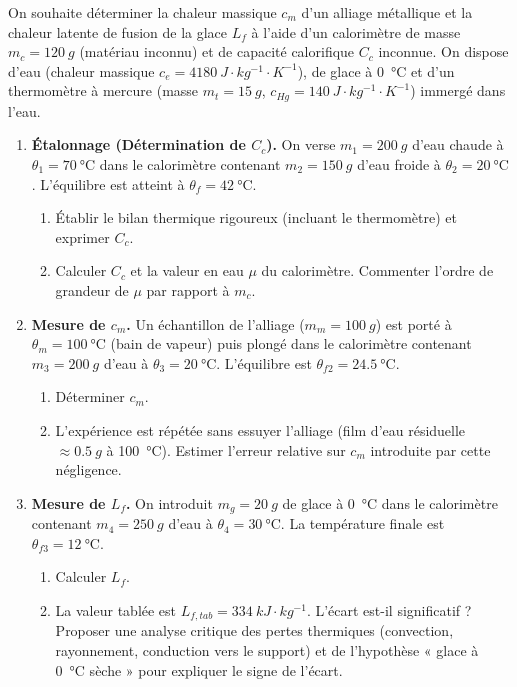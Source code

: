 \documentclass[11pt]{article}
\begin{document}
\begin{exercice}
On souhaite déterminer la chaleur massique $c_m$ d'un alliage métallique et la chaleur latente de fusion de la glace $L_f$ à l'aide d'un calorimètre de masse $m_c = \SI{120}{g}$ (matériau inconnu) et de capacité calorifique $C_c$ inconnue. On dispose d'eau (chaleur massique $c_e = \SI{4180}{J\cdot kg^{-1}\cdot K^{-1}}$), de glace à \SI{0}{\celsius} et d'un thermomètre à mercure (masse $m_t = \SI{15}{g}$, $c_{Hg} = \SI{140}{J\cdot kg^{-1}\cdot K^{-1}}$) immergé dans l'eau.

\begin{enumerate}
    \item \textbf{Étalonnage (Détermination de $C_c$).} On verse $m_1 = \SI{200}{g}$ d'eau chaude à $\theta_1 = \SI{70}{\celsius}$ dans le calorimètre contenant $m_2 = \SI{150}{g}$ d'eau froide à $\theta_2 = \SI{20}{\celsius}$. L'équilibre est atteint à $\theta_f = \SI{42}{\celsius}$. 
    \begin{enumerate}
        \item Établir le bilan thermique rigoureux (incluant le thermomètre) et exprimer $C_c$.
        \item Calculer $C_c$ et la valeur en eau $\mu$ du calorimètre. Commenter l'ordre de grandeur de $\mu$ par rapport à $m_c$.
    \end{enumerate}
    \item \textbf{Mesure de $c_m$.} Un échantillon de l'alliage ($m_m = \SI{100}{g}$) est porté à $\theta_m = \SI{100}{\celsius}$ (bain de vapeur) puis plongé dans le calorimètre contenant $m_3 = \SI{200}{g}$ d'eau à $\theta_3 = \SI{20}{\celsius}$. L'équilibre est $\theta_{f2} = \SI{24,5}{\celsius}$. 
    \begin{enumerate}
        \item Déterminer $c_m$.
        \item L'expérience est répétée sans essuyer l'alliage (film d'eau résiduelle $\approx \SI{0,5}{g}$ à \SI{100}{\celsius}). Estimer l'erreur relative sur $c_m$ introduite par cette négligence.
    \end{enumerate}
    \item \textbf{Mesure de $L_f$.} On introduit $m_g = \SI{20}{g}$ de glace à \SI{0}{\celsius} dans le calorimètre contenant $m_4 = \SI{250}{g}$ d'eau à $\theta_4 = \SI{30}{\celsius}$. La température finale est $\theta_{f3} = \SI{12}{\celsius}$. 
    \begin{enumerate}
        \item Calculer $L_f$.
        \item La valeur tablée est $L_{f,tab} = \SI{334}{kJ\cdot kg^{-1}}$. L'écart est-il significatif ? Proposer une analyse critique des pertes thermiques (convection, rayonnement, conduction vers le support) et de l'hypothèse « glace à \SI{0}{\celsius} sèche » pour expliquer le signe de l'écart.
    \end{enumerate}
\end{enumerate}
\end{exercice}
\end{document}
